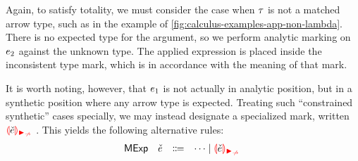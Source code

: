 Again, to satisfy totality, we must consider the case when $\TMV$ is not a matched arrow type, such
as in the example of \cref{fig:calculus-examples-app-non-lambda}. There is no expected type for the
argument, so we perform analytic marking on $\EMV_2$ against the unknown type. The applied
expression is placed inside the inconsistent type mark, which is in accordance with the meaning of
that mark.
%
\begin{mathpar}

\end{mathpar}

It is worth noting, however, that $\EMV_1$ is not actually in analytic position, but in a synthetic
position where any arrow type is expected. Treating such ``constrained synthetic'' cases specially,
we may instead designate a specialized mark, written $\ECApNonMatchedAltAlt{\ECMV}$. This yields the
following alternative rules:
%
\[\begin{array}{rrcl}
  \ECMName & \ECMV & \Coloneqq & \cdots \mid \ECApNonMatchedAltAlt{\ECMV}
\end{array}\]
%
\begin{mathpar}

\end{mathpar}

